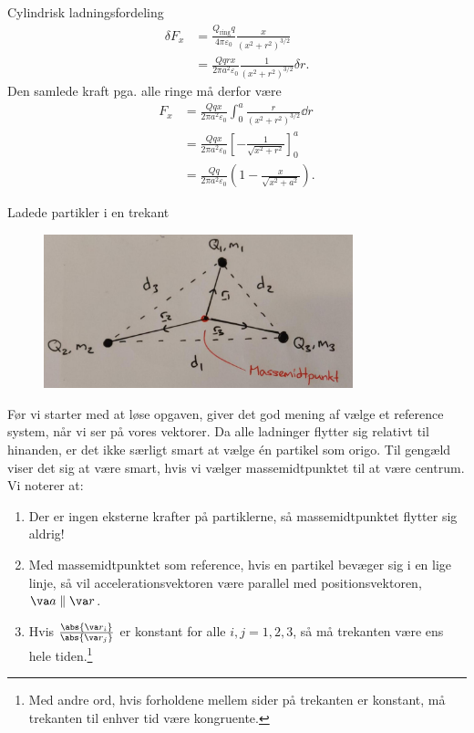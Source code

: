 \begin{opgave}{Cylindrisk ladningsfordeling}
\begin{align*}
        \delta F_x&=\frac{Q_\text{ring}q}{4\pi\varepsilon_0}\frac{x}{(x^2+r^2)^{3/2}}\\
        &=\frac{Qqrx}{2\pi a^2\varepsilon_0}\frac{1}{(x^2+r^2)^{3/2}}\delta r.
    \end{align*}
    Den samlede kraft pga. alle ringe må derfor være
    \begin{align*}
        F_x&=\frac{Qqx}{2\pi a^2\varepsilon_0}\int_0^a\frac{r}{(x^2+r^2)^{3/2}}\dd r\\
        &=\frac{Qqx}{2\pi a^2\varepsilon_0}\left[-\frac{1}{\sqrt{x^2+r^2}}\right]_0^a\\
        &=\frac{Qq}{2\pi a^2\varepsilon_0}\left(1-\frac{x}{\sqrt{x^2+a^2}}\right).
    \end{align*}
\end{opgave}

\begin{opgave}{Ladede partikler i en trekant}
    \begin{figure}[H]
        \centering
        \includegraphics[width=0.8\textwidth]{facit/figurer/elektro/elektro_opg11.jpg}
    \end{figure}
    Før vi starter med at løse opgaven, giver det god mening af vælge et reference system, når vi ser på vores vektorer. Da alle ladninger flytter sig relativt til hinanden, er det ikke særligt smart at vælge én partikel som origo. Til gengæld viser det sig at være smart, hvis vi vælger massemidtpunktet til at være centrum. Vi noterer at:
    \begin{enumerate}
        \item Der er ingen eksterne krafter på partiklerne, så massemidtpunktet flytter sig aldrig!
        \item Med massemidtpunktet som reference, hvis en partikel bevæger sig i en lige linje, så vil accelerationsvektoren være parallel med positionsvektoren, $\va a\parallel \va r$.
        \item Hvis $\frac{\abs{\va r_i}}{\abs{\va r_j}}$ er konstant for alle $i,j=1,2,3$, så må trekanten være ens hele tiden.\footnote{Med andre ord, hvis forholdene mellem sider på trekanten er konstant, må trekanten til enhver tid være kongruente.}

\end{enumerate}
\end{opgave}
